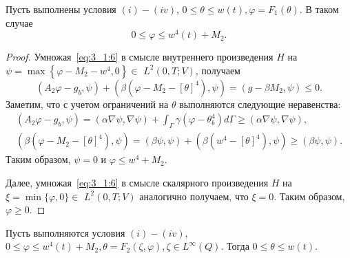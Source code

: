 \begin{lemma}
    \label{lm:3_1:1}
    Пусть выполнены условия $(i) - (iv)$, $0 \leq \theta \leq w(t), \varphi=F_{1}(\theta)$.
    В таком случае
    \begin{equation}
        \label{eq:3_1:8}
        0 \leq \varphi \leq w^{4}(t)+M_{2}.
    \end{equation}
\end{lemma}
\begin{proof}
    Умножая~\eqref{eq:3_1:6} в смысле внутреннего произведения $H$ на
    $\psi=\max \left\{\varphi-M_{2}-w^{4}, 0\right\} \in$ $L^{2}(0, T ; V)$, получаем
    \[
        \left(A_{2} \varphi-g_{b}, \psi\right)+\left(\beta\left(\varphi-M_{2}-[\theta]^{4}\right),
        \psi\right)=\left(g-\beta M_{2}, \psi\right) \leq 0.
    \]
    Заметим, что с учетом ограничений на $\theta$ выполняются следующие неравенства:
    \[
        \begin{gathered}
            \left(A_{2} \varphi-g_{b}, \psi\right)=(\alpha \nabla \psi, \nabla \psi)+
            \int_{\Gamma} \gamma\left(\varphi-\theta_{b}^{4}\right) d \Gamma
            \geq (\alpha \nabla \psi, \nabla \psi), \\
            \left(\beta\left(\varphi-M_{2}-[\theta]^{4}\right), \psi\right)=
            (\beta \psi, \psi)+\left(\beta\left(w^{4}-[\theta]^{4}\right), \psi\right)
            \geq(\beta \psi, \psi).
        \end{gathered}
    \]
    Таким образом, $\psi=0$ и $\varphi \leq w^{4}+M_{2}$.

    Далее, умножая~\eqref{eq:3_1:6} в смысле скалярного произведения $H$
    на $\xi=\min \{\varphi, 0\} \in$ $L^{2}(0, T ; V) $ аналогично получаем,
    что $\xi=0$.
    Таким образом, $\varphi\geq 0$.
\end{proof}

\begin{lemma}
    \label{lm:3_1:2}
    Пусть выполняются условия $(i)-(iv)$, $0 \leq \varphi \leq w^{4}(t)+M_{2},
    \theta=F_{2}(\zeta, \varphi), \zeta \in L^{\infty}(Q)$.
    Тогда $0 \leq \theta \leq w(t)$.
\end{lemma}


